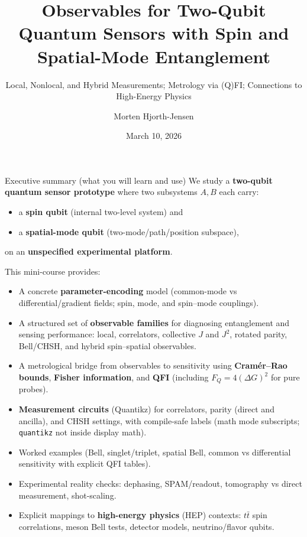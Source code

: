 \documentclass[aspectratio=169]{beamer}
\title[Two-qubit sensors: observables]{Observables for Two-Qubit Quantum Sensors with Spin and Spatial-Mode Entanglement}
\subtitle{Local, Nonlocal, and Hybrid Measurements; Metrology via (Q)FI; Connections to High-Energy Physics}
\author{Morten Hjorth-Jensen}
\date{March 10, 2026}
\begin{document}
\begin{frame}
  \titlepage
\end{frame}

\begin{frame}{Executive summary (what you will learn and use)}
\small
We study a \textbf{two-qubit quantum sensor prototype} where two subsystems $A,B$ each carry:
\begin{itemize}
\item a \textbf{spin qubit} (internal two-level system) and
\item a \textbf{spatial-mode qubit} (two-mode/path/position subspace),
\end{itemize}
on an \textbf{unspecified experimental platform}.

\vspace{0.35em}
This mini-course provides:
\begin{itemize}
\item A concrete \textbf{parameter-encoding} model (common-mode vs differential/gradient fields; spin, mode, and spin--mode couplings).
\item A structured set of \textbf{observable families} for diagnosing entanglement and sensing performance:
local, correlators, collective $J$ and $J^2$, rotated parity, Bell/CHSH, and hybrid spin--spatial observables.
\item A metrological bridge from observables to sensitivity using
\textbf{Cram\'er--Rao bounds}, \textbf{Fisher information}, and \textbf{QFI} (including $F_Q=4(\Delta G)^2$ for pure probes). \citep{BraunsteinCaves1994PRL,Paris2009IJQI,Pezze2018RMP}
\item \textbf{Measurement circuits} (Quantikz) for correlators, parity (direct and ancilla), and CHSH settings,
with compile-safe labels (math mode subscripts; \texttt{quantikz} not inside display math).
\item Worked examples (Bell, singlet/triplet, spatial Bell, common vs differential sensitivity with explicit QFI tables).
\item Experimental reality checks: dephasing, SPAM/readout, tomography vs direct measurement, shot-scaling.
\item Explicit mappings to \textbf{high-energy physics} (HEP) contexts: $t\bar t$ spin correlations, meson Bell tests,
detector models, neutrino/flavor qubits. \citep{BernreutherHeislerSi2015JHEP,BertlmannHiesmayr2001PRA,PeresTerno2004RMP,Banerjee2015EPJC,PozasKerstjensMartinMartinez2015PRD}
\end{itemize}
\end{frame}
\end{document}
